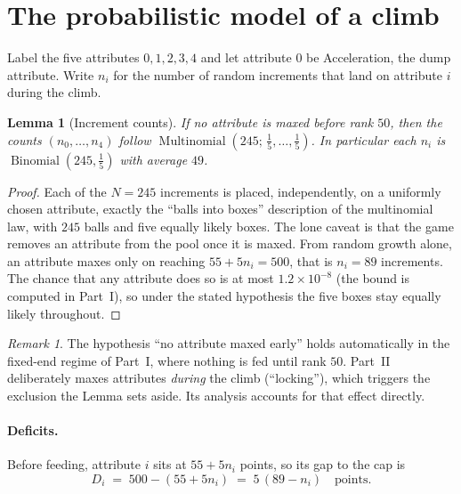 \documentclass[11pt]{article}
\newtheorem{lemma}{Lemma}
\theoremstyle{remark}
\newtheorem{remark}{Remark}
\newcommand{\Bin}{\operatorname{Binomial}}
\newcommand{\Mult}{\operatorname{Multinomial}}
\begin{document}
\section{The probabilistic model of a climb}\label{sec:prob}

Label the five attributes $0,1,2,3,4$ and let attribute $0$ be Acceleration, the
dump attribute. Write $n_i$ for the number of random increments that land on
attribute $i$ during the climb.

\begin{lemma}[Increment counts]\label{lem:mult}
If no attribute is maxed before rank $50$, then the counts $(n_0,\dots,n_4)$ follow
$\Mult\!\left(245;\,\tfrac15,\dots,\tfrac15\right)$. In particular each $n_i$ is
$\Bin(245,\tfrac15)$ with average $49$.
\end{lemma}

\begin{proof}
Each of the $N=245$ increments is placed, independently, on a uniformly chosen
attribute, exactly the ``balls into boxes'' description of the multinomial law,
with $245$ balls and five equally likely boxes. The lone caveat is that the game
removes an attribute from the pool once it is maxed. From random growth alone, an
attribute maxes only on reaching $55+5n_i=500$, that is $n_i=89$ increments. The
chance that any attribute does so is at most $1.2\times10^{-8}$ (the bound is
computed in Part~I), so under the stated hypothesis the five boxes stay equally
likely throughout.
\end{proof}

\begin{remark}
The hypothesis ``no attribute maxed early'' holds automatically in the fixed-end
regime of Part~I, where nothing is fed until rank $50$. Part~II deliberately maxes
attributes \emph{during} the climb (``locking''), which triggers the exclusion the
Lemma sets aside. Its analysis accounts for that effect directly.
\end{remark}

\paragraph{Deficits.}
Before feeding, attribute $i$ sits at $55+5n_i$ points, so its gap to the cap is
\begin{equation}\label{eq:deficit}
   D_i \;=\; 500-(55+5n_i) \;=\; 5\,(89-n_i)\quad\text{points.}
\end{equation}
\end{document}
